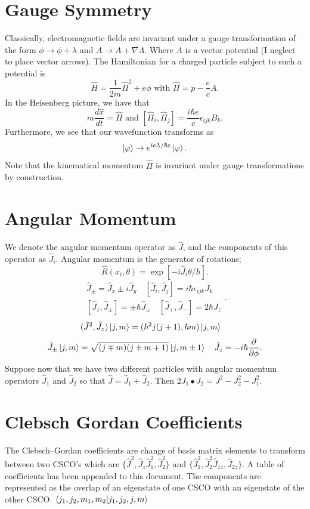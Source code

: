 \documentclass{article}
\begin{document}
  \section*{Gauge Symmetry}
    Classically, electromagnetic fields are invariant under a gauge transformation
    of the form $\phi \rightarrow \phi + \lambda$ and  $A \rightarrow A + \nabla \Lambda$. 
    Where $A$ is a vector potential (I neglect to place vector arrows). 
    The Hamiltonian for a charged particle subject to such a potential is 
     \[
       \hat H = \frac{1}{2m} \hat \Pi^2 + e \phi \text{ with } \hat\Pi = p - \frac{e}{c}A
    .\] 
    In the Heisenberg picture, we have that \[
      m \frac{d\hat{x}}{d t} = \hat{\Pi} \text{ and } [\hat{\Pi}_i,\hat{\Pi}_j] = 
      \frac{i \hbar e}{c }\epsilon_{ijk} B_k
    .\] 
    Furthermore, we see that our wavefunction transforms as \[
      \ket{\varphi} \rightarrow e^{i e \Lambda / \hbar c}\ket{\varphi}
    .\] 
    Note that the kinematical momentum $\hat \Pi $ is invariant under gauge
    transformations by construction. 

  \section*{Angular Momentum}
    We denote the angular momentum operator as $\hat J$, and the components of this
    operator as  $\hat J _i $.
    Angular momentum is the generator of rotations; 
    \[
      \hat{R}(x_i,\theta) = \exp[- i \hat J _i \theta / \hbar]
    .\] 
    \[
      \begin{split}
      \hat{J}_\pm = \hat{J}_x \pm i \hat{J}_y \quad
      [\hat J _i, \hat J _j] = i \hbar \epsilon_{ijk} J_k \quad \\
      [\hat J _z, \hat{J}_\pm] = \pm \hbar \hat{J}_\pm \quad
      [\hat J _+, \hat J _-] = 2\hbar J_z
    \end{split}
    .\]\[
    (\hat{J}^2, \hat{J}_z)\ket{j,m} = (\hbar^2j(j+1),\hbar m)\ket{j,m} \quad
    \]\[
    \hat{J}_{\pm} \ket{j,m} = \sqrt{(j\mp m)(j \pm m + 1)}\ket{j,m\pm 1} \quad
    \hat{J}_z = -i\hbar\frac{\partial}{\partial \phi}
    .\]   
    Suppose now that we have two different particles with angular momentum 
    operators $\hat J _1$ and $\hat J _2$ so that  $\hat J = \hat J _1 +\hat J_2$.
    Then  $2 J_1 \bullet J_2 = J^2 - J_2^2 - J_1^2$.

    \section*{Clebsch Gordan Coefficients}
      The Clebsch--Gordan coefficients are change of basis matrix elements 
      to transform between two CSCO's which are 
      $\{\hat J ^2, \hat J _z \hat J _1 ^2 , \hat J _2 ^2\}$ and 
      $\{\hat J _1^2 , \hat J _2^2 \hat J _{1z} , \hat J _{2z} \}$.
      A table of coefficients has been appended to this document. 
      The components are represented as the overlap of an eigenstate of one 
      CSCO with an eigenstate of the other CSCO. $\bra{j_1,j_2,m_1,m_2}\ket{j_1,j_2,j,m}$
\end{document}
